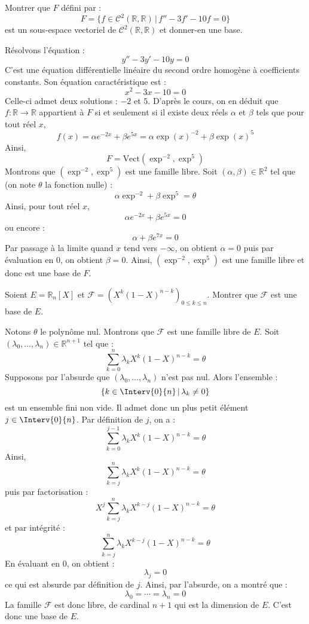 \documentclass[a4paper,10pt]{report}
\begin{document}
\medskip


\begin{Exercice}{} Montrer que $F$ défini par :
$$ F=\lbrace f \in \mathcal{C}^2(\mathbb{R}, \mathbb{R}) \, \vert \,  f''-3f'-10f= 0 \rbrace $$
est un sous-espace vectoriel de $\mathcal{C}^2(\mathbb{R}, \mathbb{R})$ et donner-en une base.
\end{Exercice} 

\corr Résolvons l'équation :
$$ y''-3y'-10y = 0$$
C'est une équation différentielle linéaire du second ordre homogène à coefficients constants. Son équation caractéristique est :
$$ x^2-3x-10=0$$
Celle-ci admet deux solutions : $-2$ et $5$. D'après le cours, on en déduit que $f : \mathbb{R} \rightarrow \mathbb{R}$ appartient à $F$ si et seulement si il existe deux réels $\alpha$ et $\beta$ tels que pour tout réel $x$,
$$ f(x) = \alpha e^{-2x} + \beta e^{5x} = \alpha \exp(x)^{-2} + \beta \exp(x)^5$$
Ainsi,
$$ F = \textrm{Vect}(\exp^{-2}, \exp^5)$$
Montrons que $(\exp^{-2}, \exp^5)$ est une famille libre. Soit $(\alpha, \beta) \in \mathbb{R}^2$ tel que (on note $\theta$ la fonction nulle) :
$$ \alpha \exp^{-2} + \beta \exp^5 = \theta$$
Ainsi, pour tout réel $x$,
$$ \alpha e^{-2x} + \beta e^{5x} = 0$$
ou encore :
$$ \alpha  + \beta e^{7x} = 0$$
Par passage à la limite quand $x$ tend vers $- \infty$, on obtient $\alpha=0$ puis par évaluation en $0$, on obtient $\beta =0$. Ainsi, $(\exp^{-2}, \exp^5)$ est une famille libre et donc est une base de $F$.

\medskip

\begin{Exercice}{} Soient $E= \mathbb{R}_n[X]$ et $\mathcal{F} = (X^k(1-X)^{n-k})_{0 \leq k \leq n}$. Montrer que $\mathcal{F}$ est une base de $E$.
\end{Exercice}

\corr Notons $\theta$ le polynôme nul. Montrons que $\mathcal{F}$ est une famille libre de $E$. Soit $(\lambda_0, \ldots, \lambda_n) \in \mathbb{R}^{n+1}$ tel que :
$$ \sum_{k=0}^n \lambda_k X^k (1-X)^{n-k} = \theta$$
Supposons par l'absurde que $(\lambda_0, \ldots, \lambda_n)$ n'est pas nul. Alors l'ensemble :
$$ \lbrace k \in \Interv{0}{n} \, \vert \, \lambda_k \neq 0 \rbrace$$
est un ensemble fini non vide. Il admet donc un plus petit élément $j \in \Interv{0}{n}$. Par définition de $j$, on a :
$$ \sum_{k=0}^{j-1} \lambda_k X^k (1-X)^{n-k} = \theta$$
Ainsi,
$$ \sum_{k=j}^n \lambda_k X^k (1-X)^{n-k} = \theta$$
puis par factorisation :
$$ X^j \sum_{k=j}^n \lambda_k X^{k-j} (1-X)^{n-k} = \theta$$
et par intégrité :
$$ \sum_{k=j}^n \lambda_k X^{k-j} (1-X)^{n-k} = \theta$$
En évaluant en $0$, on obtient :
$$ \lambda_j = 0$$
ce qui est absurde par définition de $j$. Ainsi, par l'absurde, on a montré que :
$$ \lambda_0 = \cdots = \lambda_n = 0$$
La famille $\mathcal{F}$ est donc libre, de cardinal $n+1$ qui est la dimension de $E$. C'est donc une base de $E$.
\end{document}
